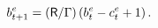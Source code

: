 \begin{equation}
b^{e}_{t+1} = (\mathsf{R}/\Gamma)\left(b^{e}_{t} -c^{e}_{t}+1\right).
\label{eq:ibcnorm}
\end{equation}
